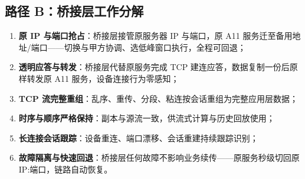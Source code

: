 \documentclass[11pt,a4paper]{ctexart}
\begin{document}
\subsection{路径 B：桥接层工作分解}

\begin{enumerate}[leftmargin=*]
  \item \textbf{原 IP 与端口抢占}：桥接层接管原服务器 IP 与端口，原 A11 服务迁至备用地址/端口——切换与甲方协调、选低峰窗口执行，全程可回退；
  \item \textbf{透明应答与转发}：桥接层代替原服务完成 TCP 建连应答，数据复制一份后原样转发原 A11 服务，设备连接行为零感知；
  \item \textbf{TCP 流完整重组}：乱序、重传、分段、粘连按会话重组为完整应用层数据；
  \item \textbf{时序与顺序严格保持}：副本与源流一致，供流式计算与历史回放使用；
  \item \textbf{长连接会话跟踪}：设备重连、端口漂移、会话重建持续跟踪识别；
  \item \textbf{故障隔离与快速回退}：桥接层任何故障不影响业务续传——原服务秒级切回原 IP:端口，链路自动恢复。
\end{enumerate}
\end{document}
